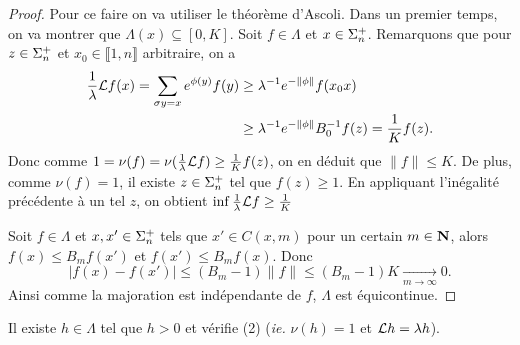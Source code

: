   \begin{proof}
    Pour ce faire on va utiliser le théorème d'Ascoli. Dans un premier temps, on va montrer que $\Lambda(x) \subseteq [0, K]$.
    Soit $f \in \Lambda$ et $x \in \sp_n$. Remarquons que pour $z \in \sp_n$ et $x_0 \in \llbracket 1, n \rrbracket$ arbitraire, on a
    \begin{align*}
      \frac 1 \lambda \L f(x) = \sum_{\sigma y = x}{e^{\phi(y)}f(y)} &\geq \lambda^{-1}e^{-\lVert\phi\rVert}f(x_0x) \\
								     &\geq \lambda^{-1}e^{-\lVert\phi\rVert}B_0^{-1}f(z) = \frac 1 K f(z).
    \end{align*}
    Donc comme $1 = \nu(f) = \nu(\frac 1 \lambda \L f) \geq \frac 1 K f(z)$, on en déduit que $\lVert f\rVert \leq K$.
    De plus, comme $\nu(f) = 1$, il existe $z \in \sp_n$ tel que $f(z) \geq 1$. En appliquant l'inégalité précédente à un tel $z$,
    on obtient $\inf{\frac 1 \lambda \L f} \geq \frac 1 K$

    Soit $f \in \Lambda$ et $x, x' \in \sp_n$ tels que $x' \in C(x, m)$ pour un certain $m \in \N$,
    alors $f(x) \leq B_mf(x')$ et $f(x') \leq B_mf(x)$. Donc
    $$\left|f(x) - f(x')\right| \leq (B_m - 1)\lVert f\rVert \leq (B_m - 1)K \underset{m\to\infty}{\longrightarrow} 0.$$
    Ainsi comme la majoration est indépendante de $f$, $\Lambda$ est équicontinue.
  \end{proof}

  \begin{proposition}
    \label{prop:rpf_2}
    \leanok
    Il existe $h \in \Lambda$ tel que $h > 0$ et vérifie (2) (\textit{ie.} $\nu(h) = 1$ et $\L h = \lambda h$).
  \end{proposition}

